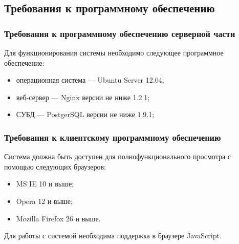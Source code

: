 \subsection{Требования к программному обеспечению}


\subsubsection{Требования к программному обеспечению серверной части}
Для функционирования системы необходимо следующее программное обеспечение:
\begin{itemize}
\item операционная система --– Ubuntu Server 12.04;
\item веб-сервер --– Nginx версии не ниже 1.2.1;
\item СУБД –-- PostgerSQL версии не ниже 1.9.1;
\end{itemize}

\subsubsection{Требования к клиентскому программному обеспечению}
Система должна быть доступен для полнофункционального просмотра с помощью следующих браузеров:
\begin{itemize}
\item MS IE 10 и выше;
\item Opera 12 и выше;
\item Mozilla Firefox 26 и выше.
\end{itemize}
Для работы с системой необходима поддержка в браузере JavaScript.
